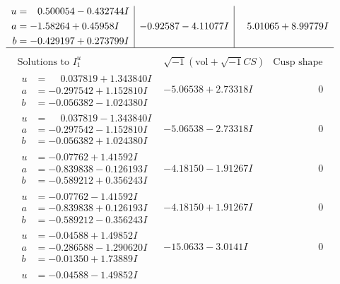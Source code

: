 \documentclass[1p]{elsarticle_modified}
\theoremstyle{definition}
\newcommand{\I}{\sqrt{-1}}
\begin{document}
$$\begin{array}{c|c|c}
\begin{aligned}
u &= \phantom{-}0.500054 - 0.432744 I \\
a &= -1.58264 + 0.45958 I \\
b &= -0.429197 + 0.273799 I\end{aligned}
 & -0.92587 - 4.11077 I & \phantom{-}5.01065 + 8.99779 I\\
 \hline 
 \end{array}$$\newpage$$\begin{array}{c|c|c}  
\text{Solutions to }I^u_{1}& \I (\text{vol} + \sqrt{-1}CS) & \text{Cusp shape}\\
 \hline 
\begin{aligned}
u &= \phantom{-}0.037819 + 1.343840 I \\
a &= -0.297542 + 1.152810 I \\
b &= -0.056382 - 1.024380 I\end{aligned}
 & -5.06538 + 2.73318 I & \phantom{-0.000000 } 0 \\ \hline\begin{aligned}
u &= \phantom{-}0.037819 - 1.343840 I \\
a &= -0.297542 - 1.152810 I \\
b &= -0.056382 + 1.024380 I\end{aligned}
 & -5.06538 - 2.73318 I & \phantom{-0.000000 } 0 \\ \hline\begin{aligned}
u &= -0.07762 + 1.41592 I \\
a &= -0.839838 - 0.126193 I \\
b &= -0.589212 + 0.356243 I\end{aligned}
 & -4.18150 - 1.91267 I & \phantom{-0.000000 } 0 \\ \hline\begin{aligned}
u &= -0.07762 - 1.41592 I \\
a &= -0.839838 + 0.126193 I \\
b &= -0.589212 - 0.356243 I\end{aligned}
 & -4.18150 + 1.91267 I & \phantom{-0.000000 } 0 \\ \hline\begin{aligned}
u &= -0.04588 + 1.49852 I \\
a &= -0.286588 - 1.290620 I \\
b &= -0.01350 + 1.73889 I\end{aligned}
 & -15.0633 - 3.0141 I & \phantom{-0.000000 } 0 \\ \hline\begin{aligned}
u &= -0.04588 - 1.49852 I \\

\end{aligned}
\end{array}$$
\end{document}
